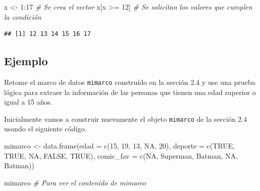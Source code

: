 \documentclass[
]{book}
\makeatletter
\newenvironment{Shaded}{\begin{snugshade}}{\end{snugshade}}
\newcommand{\AttributeTok}[1]{\textcolor[rgb]{0.77,0.63,0.00}{#1}}
\newcommand{\CommentTok}[1]{\textcolor[rgb]{0.56,0.35,0.01}{\textit{#1}}}
\newcommand{\ConstantTok}[1]{\textcolor[rgb]{0.00,0.00,0.00}{#1}}
\newcommand{\DecValTok}[1]{\textcolor[rgb]{0.00,0.00,0.81}{#1}}
\newcommand{\FunctionTok}[1]{\textcolor[rgb]{0.00,0.00,0.00}{#1}}
\newcommand{\NormalTok}[1]{#1}
\newcommand{\OtherTok}[1]{\textcolor[rgb]{0.56,0.35,0.01}{#1}}
\newcommand{\SpecialCharTok}[1]{\textcolor[rgb]{0.00,0.00,0.00}{#1}}
\newcommand{\StringTok}[1]{\textcolor[rgb]{0.31,0.60,0.02}{#1}}
\newenvironment{kframe}{%
\medskip{}
\setlength{\fboxsep}{.8em}
 \def\at@end@of@kframe{}%
 \ifinner\ifhmode%
  \def\at@end@of@kframe{\end{minipage}}%
  \begin{minipage}{\columnwidth}%
 \fi\fi%
 \def\FrameCommand##1{\hskip\@totalleftmargin \hskip-\fboxsep
 \colorbox{shadecolor}{##1}\hskip-\fboxsep
     \hskip-\linewidth \hskip-\@totalleftmargin \hskip\columnwidth}%
 \MakeFramed {\advance\hsize-\width
   \@totalleftmargin\z@ \linewidth\hsize
   \@setminipage}}%
 {\par\unskip\endMakeFramed%
 \at@end@of@kframe}
\renewenvironment{Shaded}{\begin{kframe}}{\end{kframe}}
\makeatother
\begin{document}
\begin{Shaded}
\begin{Highlighting}[]
\NormalTok{x }\OtherTok{\textless{}{-}} \DecValTok{1}\SpecialCharTok{:}\DecValTok{17}  \CommentTok{\# Se crea el vector}
\NormalTok{x[x }\SpecialCharTok{\textgreater{}=} \DecValTok{12}\NormalTok{]  }\CommentTok{\# Se solicitan los valores que cumplen la condición}
\end{Highlighting}
\end{Shaded}

\begin{verbatim}
## [1] 12 13 14 15 16 17
\end{verbatim}

\hypertarget{ejemplo-7}{%
\subsection*{Ejemplo}\label{ejemplo-7}}

Retome el marco de datos \texttt{mimarco} construído en la sección 2.4 y use una prueba lógica para extraer la información de las personas que tienen una edad superior o igual a 15 años.

Inicialmente vamos a construir nuevamente el objeto \texttt{mimarco} de la sección 2.4 usando el siguiente código.

\begin{Shaded}
\begin{Highlighting}[]
\NormalTok{mimarco }\OtherTok{\textless{}{-}} \FunctionTok{data.frame}\NormalTok{(}\AttributeTok{edad =} \FunctionTok{c}\NormalTok{(}\DecValTok{15}\NormalTok{, }\DecValTok{19}\NormalTok{, }\DecValTok{13}\NormalTok{, }\ConstantTok{NA}\NormalTok{, }\DecValTok{20}\NormalTok{), }
                      \AttributeTok{deporte =} \FunctionTok{c}\NormalTok{(}\ConstantTok{TRUE}\NormalTok{, }\ConstantTok{TRUE}\NormalTok{, }\ConstantTok{NA}\NormalTok{, }\ConstantTok{FALSE}\NormalTok{, }\ConstantTok{TRUE}\NormalTok{),}
                      \AttributeTok{comic\_fav =} \FunctionTok{c}\NormalTok{(}\ConstantTok{NA}\NormalTok{, }\StringTok{\textquotesingle{}Superman\textquotesingle{}}\NormalTok{, }\StringTok{\textquotesingle{}Batman\textquotesingle{}}\NormalTok{, }\ConstantTok{NA}\NormalTok{, }\StringTok{\textquotesingle{}Batman\textquotesingle{}}\NormalTok{))}

\NormalTok{mimarco  }\CommentTok{\# Para ver el contenido de mimarco}
\end{Highlighting}
\end{Shaded}
\end{document}
